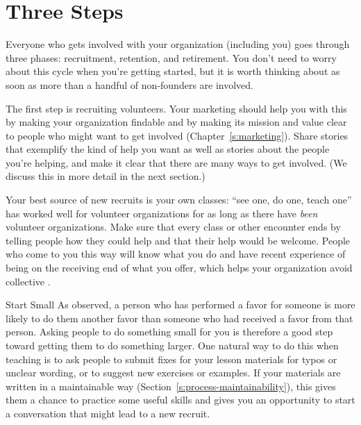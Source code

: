 \section{Three Steps}\label{s:community-three-steps}

Everyone who gets involved with your organization
(including you)
goes through three phases:
recruitment, retention, and retirement.
You don't need to worry about this cycle when you're getting started,
but it is worth thinking about
as soon as more than a handful of non-founders are involved.

The first step is recruiting volunteers.
Your marketing should help you with this by making your organization findable
and by making its mission and value clear
to people who might want to get involved
(Chapter~\ref{s:marketing}).
Share stories that exemplify the kind of help you want
as well as stories about the people you're helping,
and make it clear that there are many ways to get involved.
(We discuss this in more detail in the next section.)

Your best source of new recruits is your own classes:
``see one, do one, teach one'' has worked well for volunteer organizations
for as long as there have \emph{been} volunteer organizations.
Make sure that every class or other encounter
ends by telling people how they could help and that their help would be welcome.
People who come to you this way will know what you do
and have recent experience of being on the receiving end of what you offer,
which helps your organization avoid collective .

\begin{aside}{Start Small}
  As  observed,
  a person who has performed a favor for someone
  is more likely to do them another favor
  than someone who had received a favor from that person.
  Asking people to do something small for you
  is therefore a good step toward getting them to do something larger.
  One natural way to do this when teaching
  is to ask people to submit fixes for your lesson materials for typos or unclear wording,
  or to suggest new exercises or examples.
  If your materials are written in a maintainable way (Section~\ref{s:process-maintainability}),
  this gives them a chance to practice some useful skills
  and gives you an opportunity to start a conversation
  that might lead to a new recruit.
\end{aside}


